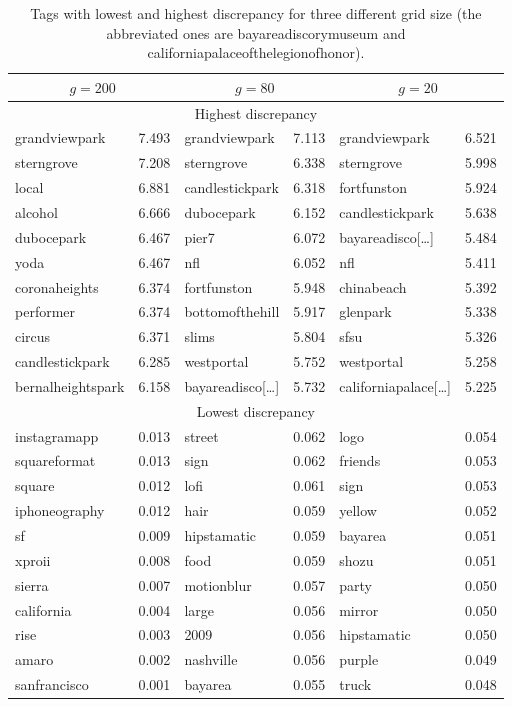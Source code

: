 \begin{table}[ht]
\centering
\setlength{\tabcolsep}{1.2em}
\begin{tabular}{lclclc}
\toprule
 \multicolumn{2}{c}{$g=200$}&  \multicolumn{2}{c}{$g=80$}&  \multicolumn{2}{c}{$g=20$}  \\
\midrule
\multicolumn{6}{c}{Highest discrepancy} \\
\midrule
grandviewpark     & 7.493 & grandviewpark   & 7.113 & grandviewpark       & 6.521 \\
sterngrove        & 7.208 & sterngrove      & 6.338 & sterngrove          & 5.998 \\
local             & 6.881 & candlestickpark & 6.318 & fortfunston         & 5.924 \\
alcohol           & 6.666 & dubocepark      & 6.152 & candlestickpark     & 5.638 \\
dubocepark        & 6.467 & pier7           & 6.072 & bayareadisco[…]     & 5.484 \\
yoda              & 6.467 & nfl             & 6.052 & nfl                 & 5.411 \\
coronaheights     & 6.374 & fortfunston     & 5.948 & chinabeach          & 5.392 \\
performer         & 6.374 & bottomofthehill & 5.917 & glenpark            & 5.338 \\
circus            & 6.371 & slims           & 5.804 & sfsu                & 5.326 \\
candlestickpark   & 6.285 & westportal      & 5.752 & westportal          & 5.258 \\
bernalheightspark & 6.158 & bayareadisco[…] & 5.732 & californiapalace[…] & 5.225 \\
\midrule
\multicolumn{6}{c}{Lowest discrepancy} \\
\midrule
instagramapp  & 0.013 & street      & 0.062 & logo        & 0.054 \\
squareformat  & 0.013 & sign        & 0.062 & friends     & 0.053 \\
square        & 0.012 & lofi        & 0.061 & sign        & 0.053 \\
iphoneography & 0.012 & hair        & 0.059 & yellow      & 0.052 \\
sf            & 0.009 & hipstamatic & 0.059 & bayarea     & 0.051 \\
xproii        & 0.008 & food        & 0.059 & shozu       & 0.051 \\
sierra        & 0.007 & motionblur  & 0.057 & party       & 0.050 \\
california    & 0.004 & large       & 0.056 & mirror      & 0.050 \\
rise          & 0.003 & 2009        & 0.056 & hipstamatic & 0.050 \\
amaro         & 0.002 & nashville   & 0.056 & purple      & 0.049 \\
sanfrancisco  & 0.001 & bayarea     & 0.055 & truck       & 0.048 \\
\bottomrule
\end{tabular}
\caption{Tags with lowest and highest discrepancy for three different grid
size (the abbreviated ones are \textsf{bayareadiscorymuseum} and
	\textsf{californiapalaceofthelegionofhonor}).\label{t:disc}}
\end{table}
